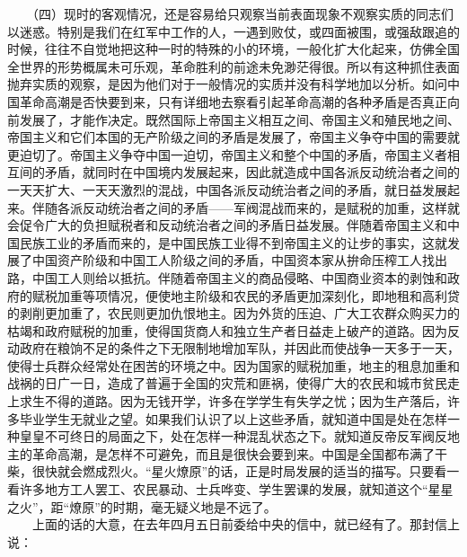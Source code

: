 \documentclass[cn,11pt,chinese]{elegantbook}
\begin{document}
　　（四）现时的客观情况，还是容易给只观察当前表面现象不观察实质的同志们以迷惑。特别是我们在红军中工作的人，一遇到败仗，或四面被围，或强敌跟追的时候，往往不自觉地把这种一时的特殊的小的环境，一般化扩大化起来，仿佛全国全世界的形势概属未可乐观，革命胜利的前途未免渺茫得很。所以有这种抓住表面抛弃实质的观察，是因为他们对于一般情况的实质并没有科学地加以分析。如问中国革命高潮是否快要到来，只有详细地去察看引起革命高潮的各种矛盾是否真正向前发展了，才能作决定。既然国际上帝国主义相互之间、帝国主义和殖民地之间、帝国主义和它们本国的无产阶级之间的矛盾是发展了，帝国主义争夺中国的需要就更迫切了。帝国主义争夺中国一迫切，帝国主义和整个中国的矛盾，帝国主义者相互间的矛盾，就同时在中国境内发展起来，因此就造成中国各派反动统治者之间的一天天扩大、一天天激烈的混战，中国各派反动统治者之间的矛盾，就日益发展起来。伴随各派反动统治者之间的矛盾——军阀混战而来的，是赋税的加重，这样就会促令广大的负担赋税者和反动统治者之间的矛盾日益发展。伴随着帝国主义和中国民族工业的矛盾而来的，是中国民族工业得不到帝国主义的让步的事实，这就发展了中国资产阶级和中国工人阶级之间的矛盾，中国资本家从拚命压榨工人找出路，中国工人则给以抵抗。伴随着帝国主义的商品侵略、中国商业资本的剥蚀和政府的赋税加重等项情况，便使地主阶级和农民的矛盾更加深刻化，即地租和高利贷的剥削更加重了，农民则更加仇恨地主。因为外货的压迫、广大工农群众购买力的枯竭和政府赋税的加重，使得国货商人和独立生产者日益走上破产的道路。因为反动政府在粮饷不足的条件之下无限制地增加军队，并因此而使战争一天多于一天，使得士兵群众经常处在困苦的环境之中。因为国家的赋税加重，地主的租息加重和战祸的日广一日，造成了普遍于全国的灾荒和匪祸，使得广大的农民和城市贫民走上求生不得的道路。因为无钱开学，许多在学学生有失学之忧；因为生产落后，许多毕业学生无就业之望。如果我们认识了以上这些矛盾，就知道中国是处在怎样一种皇皇不可终日的局面之下，处在怎样一种混乱状态之下。就知道反帝反军阀反地主的革命高潮，是怎样不可避免，而且是很快会要到来。中国是全国都布满了干柴，很快就会燃成烈火。“星火燎原”的话，正是时局发展的适当的描写。只要看一看许多地方工人罢工、农民暴动、士兵哗变、学生罢课的发展，就知道这个“星星之火”，距“燎原”的时期，毫无疑义地是不远了。\\
　　上面的话的大意，在去年四月五日前委给中央的信中，就已经有了。那封信上说：\\
\end{document}
